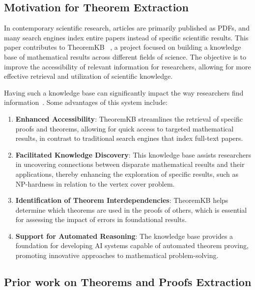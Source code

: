 \documentclass[runningheads]{llncs}
\begin{document}
\subsection{Motivation for Theorem Extraction}
In contemporary scientific research, articles are primarily published as PDFs, and many 
search engines index entire papers instead of specific scientific results. This paper 
contributes to TheoremKB ~\cite{doceng_paper}, a project focused on building a knowledge base of mathematical 
results across different fields of science. The objective is to improve the accessibility of 
relevant information for researchers, allowing for more effective retrieval and utilization 
of scientific knowledge.

Having such a knowledge base can significantly impact the way researchers find information~\cite{mishra2024first}. 
Some advantages of this system include:

\begin{enumerate}
    \item \textbf{Enhanced Accessibility}: TheoremKB streamlines the retrieval of specific 
    proofs and theorems, allowing for quick access to targeted mathematical results, 
    in contrast to traditional search engines that index full-text papers.

    \item \textbf{Facilitated Knowledge Discovery}: This knowledge base assists researchers 
    in uncovering connections between disparate mathematical results and their applications, 
    thereby enhancing the exploration of specific results, such as NP-hardness in relation to 
    the vertex cover problem.

    \item \textbf{Identification of Theorem Interdependencies}: TheoremKB helps determine 
    which theorems are used in the proofs of others, which is essential for assessing the 
    impact of errors in foundational results.

    \item \textbf{Support for Automated Reasoning}: The knowledge base provides a foundation 
    for developing AI systems capable of automated theorem proving, promoting innovative 
    approaches to mathematical problem-solving.
\end{enumerate}

\subsection{Prior work on Theorems and Proofs Extraction}
\end{document}
